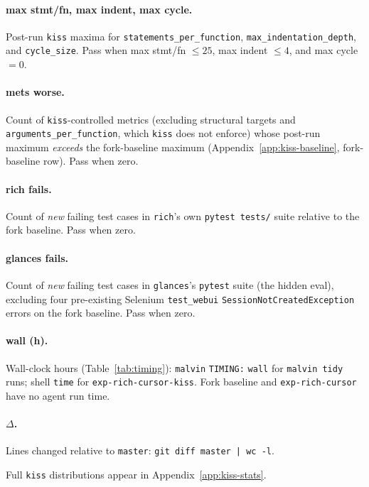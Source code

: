 \documentclass[11pt]{article}
\begin{document}
\paragraph{max stmt/fn, max indent, max cycle.} Post-run \texttt{kiss} maxima for \texttt{statements\_per\_function}, \texttt{max\_indentation\_depth}, and \texttt{cycle\_size}. Pass when max stmt/fn $\leq 25$, max indent $\leq 4$, and max cycle $= 0$.

\paragraph{mets worse.} Count of \texttt{kiss}-controlled metrics (excluding structural targets and \texttt{arguments\_per\_function}, which \texttt{kiss} does not enforce) whose post-run maximum \emph{exceeds} the fork-baseline maximum (Appendix~\ref{app:kiss-baseline}, fork-baseline row). Pass when zero.

\paragraph{rich fails.} Count of \emph{new} failing test cases in {\texttt{rich}}'s own \texttt{pytest tests/} suite relative to the fork baseline. Pass when zero.

\paragraph{glances fails.} Count of \emph{new} failing test cases in {\texttt{glances}}'s \texttt{pytest} suite (the hidden eval), excluding four pre-existing Selenium \texttt{test\_webui} \texttt{SessionNotCreatedException} errors on the fork baseline. Pass when zero.

\paragraph{wall (h).} Wall-clock hours (Table~\ref{tab:timing}): \texttt{malvin} \texttt{TIMING:} \texttt{wall} for \texttt{malvin tidy} runs; shell \texttt{time} for \texttt{exp-rich-cursor-kiss}. Fork baseline and \texttt{exp-rich-cursor} have no agent run time.

\paragraph{$\Delta$.} Lines changed relative to \texttt{master}: \texttt{git diff master | wc -l}.

Full \texttt{kiss} distributions appear in Appendix~\ref{app:kiss-stats}.
\end{document}
